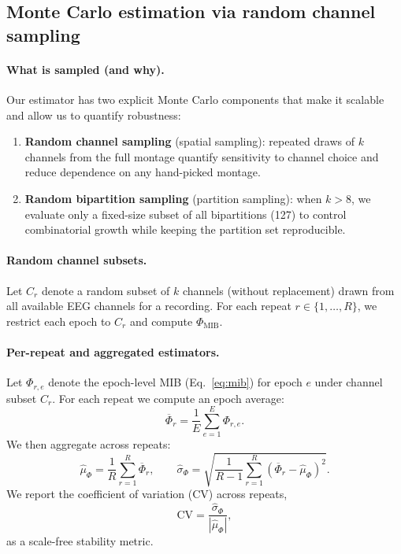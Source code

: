 \documentclass[11pt]{article}
\begin{document}
\subsection{Monte Carlo estimation via random channel sampling}
\paragraph{What is sampled (and why).}
Our estimator has two explicit Monte Carlo components that make it scalable and allow us to quantify robustness:
\begin{enumerate}[leftmargin=*]
    \item \textbf{Random channel sampling} (spatial sampling): repeated draws of $k$ channels from the full montage quantify sensitivity to channel choice and reduce dependence on any hand-picked montage.
    \item \textbf{Random bipartition sampling} (partition sampling): when $k>8$, we evaluate only a fixed-size subset of all bipartitions (127) to control combinatorial growth while keeping the partition set reproducible.
\end{enumerate}

\paragraph{Random channel subsets.}
Let $C_r$ denote a random subset of $k$ channels (without replacement) drawn from all available EEG channels for a recording. For each repeat $r \in \{1,\dots,R\}$, we restrict each epoch to $C_r$ and compute $\Phi_{\mathrm{MIB}}$.

\paragraph{Per-repeat and aggregated estimators.}
Let $\Phi_{r,e}$ denote the epoch-level MIB (Eq.~\eqref{eq:mib}) for epoch $e$ under channel subset $C_r$. For each repeat we compute an epoch average:
\begin{equation}
\overline{\Phi}_{r} = \frac{1}{E}\sum_{e=1}^{E} \Phi_{r,e}.
\label{eq:repeat_mean}
\end{equation}
We then aggregate across repeats:
\begin{equation}
\widehat{\mu}_{\Phi} = \frac{1}{R}\sum_{r=1}^{R}\overline{\Phi}_{r},
\qquad
\widehat{\sigma}_{\Phi} = \sqrt{\frac{1}{R-1}\sum_{r=1}^{R}\left(\overline{\Phi}_{r}-\widehat{\mu}_{\Phi}\right)^2 }.
\label{eq:aggregate_mean}
\end{equation}
We report the coefficient of variation (CV) across repeats,
\begin{equation}
\mathrm{CV} = \frac{\widehat{\sigma}_{\Phi}}{|\widehat{\mu}_{\Phi}|},
\label{eq:cv}
\end{equation}
as a scale-free stability metric.
\end{document}
